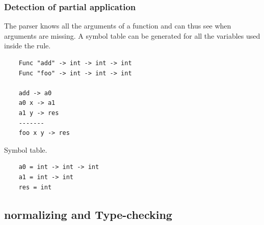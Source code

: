 \begin{frame}[fragile]
    \frametitle{Detection of partial application}   
    The parser knows all the arguments of a function and can thus see when arguments are missing.
    A symbol table can be generated for all the variables used inside the rule.

    \begin{lstlisting}
    Func "add" -> int -> int -> int
    Func "foo" -> int -> int -> int
    
    add -> a0
    a0 x -> a1
    a1 y -> res
    -------
    foo x y -> res
    \end{lstlisting}

    Symbol table.
    \begin{lstlisting}
    a0 = int -> int -> int
    a1 = int -> int
    res = int
    \end{lstlisting}
\end{frame}

\subsection{normalizing and Type-checking}

\frame{
    \frametitle{}
}

